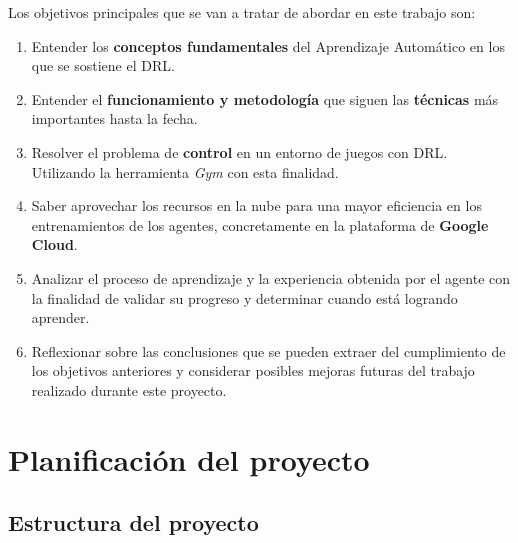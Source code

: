 \documentclass[11pt,fleqn]{book} %
\begin{document}
Los objetivos principales que se van a tratar de abordar en este trabajo son: \\

\begin{enumerate}
	\item Entender los \textbf{conceptos fundamentales} del Aprendizaje Automático en los que se sostiene el DRL. \\
	
	\item Entender el \textbf{funcionamiento y metodología} que siguen las \textbf{técnicas} más importantes hasta la fecha. \\
	
	\item Resolver el problema de \textbf{control} en un entorno de juegos con DRL. Utilizando la herramienta \textit{Gym} con esta finalidad. \cite{article:gym} \\
	
	\item Saber aprovechar los recursos en la nube para una mayor eficiencia en los entrenamientos de los agentes, concretamente en la plataforma de \textbf{Google Cloud}. \\
	
	\item Analizar el proceso de aprendizaje y la experiencia obtenida por el agente con la finalidad de validar su progreso y determinar cuando está logrando aprender. \\
	
	
	\item Reflexionar sobre las conclusiones que se pueden extraer del cumplimiento de los objetivos anteriores y considerar posibles mejoras futuras del trabajo realizado durante este proyecto.
\end{enumerate}

\section{Planificación del proyecto}\label{sec:planificacion}

\subsection{Estructura del proyecto}
\end{document}

